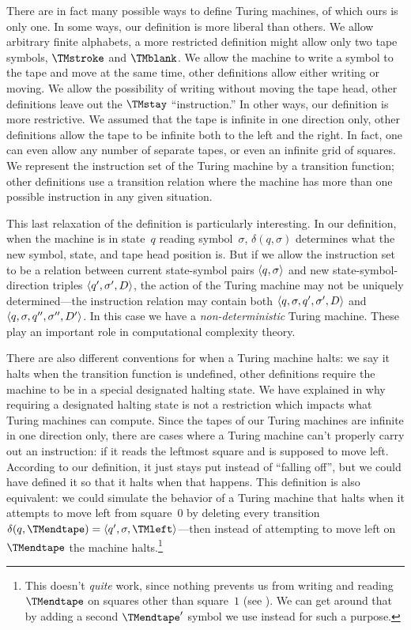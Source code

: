 \documentclass[../../../include/open-logic-section]{subfiles}
\begin{document}

There are in fact many possible ways to define Turing machines, of
which ours is only one.  In some ways, our definition is more liberal
than others. We allow arbitrary finite alphabets, a more restricted
definition might allow only two tape symbols, $\TMstroke$ and
$\TMblank$.  We allow the machine to write a symbol to the tape and
move at the same time, other definitions allow either writing or
moving.  We allow the possibility of writing without moving the tape
head, other definitions leave out the $\TMstay$ ``instruction.''  In
other ways, our definition is more restrictive. We assumed that the
tape is infinite in one direction only, other definitions allow the
tape to be infinite both to the left and the right. In fact, one can
even allow any number of separate tapes, or even an infinite grid
of squares.  We represent the instruction set of the Turing machine by
a transition function; other definitions use a transition relation
where the machine has more than one possible instruction in any given
situation.

This last relaxation of the definition is particularly interesting.
In our definition, when the machine is in state~$q$ reading
symbol~$\sigma$, $\delta(q, \sigma)$ determines what the new symbol,
state, and tape head position is.  But if we allow the instruction set
to be a relation between current state-symbol pairs $\langle q,
  \sigma \rangle$ and new state-symbol-direction triples $\langle q', \sigma',
  D \rangle$, the action of the Turing machine may not be uniquely
determined---the instruction relation may contain both $\langle q,
  \sigma, q', \sigma', D \rangle$ and $\langle q, \sigma, q'', \sigma'', D' \rangle$.
In this case we have a \emph{non-deterministic} Turing machine.  These
play an important role in computational complexity theory.

There are also different conventions for when a Turing machine halts:
we say it halts when the transition function is undefined, other
definitions require the machine to be in a special designated halting
state. We have explained in  why requiring a designated
halting state is not a restriction which impacts what Turing machines can
compute.  Since the tapes of our Turing machines are infinite in one
direction only, there are cases where a Turing machine can't properly
carry out an instruction: if it reads the leftmost square and is
supposed to move left. According to our definition, it just stays put
instead of ``falling off'', but we could have defined it so that it
halts when that happens. This definition is also equivalent: we could
simulate the behavior of a Turing machine that halts when it attempts
to move left from square~$0$ by deleting every transition
$\delta(q,\TMendtape) = \tuple{q',\sigma,\TMleft}$---then instead of
attempting to move left on~$\TMendtape$ the machine
halts.\footnote{This doesn't \emph{quite} work, since nothing prevents
us from writing and reading $\TMendtape$ on squares other than
square~$1$ (see ). We can get around that by
adding a second $\TMendtape'$ symbol we use instead for such a
purpose.}
\end{document}

